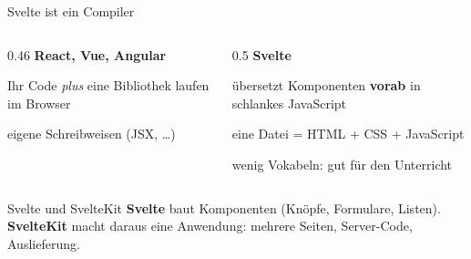 \begin{frame}{Svelte ist ein Compiler}
  \begin{columns}[onlytextwidth,t]
    \begin{column}{0.46\textwidth}
      \textbf{React, Vue, Angular}
      \begin{tugitemize}
        \item Ihr Code \emph{plus} eine Bibliothek laufen im Browser
        \item eigene Schreibweisen (JSX, \dots)
      \end{tugitemize}
    \end{column}
    \begin{column}{0.5\textwidth}
      \textbf{Svelte}
      \begin{tugitemize}
        \item[\itemPlus] übersetzt Komponenten \textbf{vorab} in schlankes JavaScript
        \item[\itemPlus] eine Datei = HTML + CSS + JavaScript
        \item[\itemPlus] wenig Vokabeln: gut für den Unterricht
      \end{tugitemize}
    \end{column}
  \end{columns}
  \vspace{0.5em}
  \begin{block}{Svelte und SvelteKit}
    \small\textbf{Svelte} baut Komponenten (Knöpfe, Formulare, Listen).
    \textbf{SvelteKit} macht daraus eine Anwendung: mehrere Seiten, Server-Code, Auslieferung.
  \end{block}
\end{frame}


